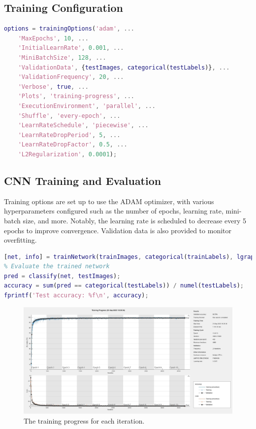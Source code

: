 \subsection{Training Configuration}

\begin{lstlisting}[language=Matlab]
options = trainingOptions('adam', ...
    'MaxEpochs', 10, ...
    'InitialLearnRate', 0.001, ...
    'MiniBatchSize', 128, ...
    'ValidationData', {testImages, categorical(testLabels)}, ...
    'ValidationFrequency', 20, ...
    'Verbose', true, ...
    'Plots', 'training-progress', ...
    'ExecutionEnvironment', 'parallel', ...
    'Shuffle', 'every-epoch', ...
    'LearnRateSchedule', 'piecewise', ...
    'LearnRateDropPeriod', 5, ...
    'LearnRateDropFactor', 0.5, ...
    'L2Regularization', 0.0001);
\end{lstlisting}

\subsection{CNN Training and Evaluation}
Training options are set up to use the ADAM optimizer, with various hyperparameters configured such as the number of epochs, learning rate, mini-batch size, and more. Notably, the learning rate is scheduled to decrease every 5 epochs to improve convergence. Validation data is also provided to monitor overfitting.


\begin{lstlisting}[language=Matlab]
%% Train the CNN
[net, info] = trainNetwork(trainImages, categorical(trainLabels), lgraph, options);
% Evaluate the trained network
pred = classify(net, testImages);
accuracy = sum(pred == categorical(testLabels)) / numel(testLabels);
fprintf('Test accuracy: %f\n', accuracy);
\end{lstlisting}
\begin{figure}[h]
    \centering
    \includegraphics[width=1\textwidth]{cnn_training.jpg}
    \caption{The training progress for each iteration.}
    \label{fig:the training progress} 
\end{figure}

